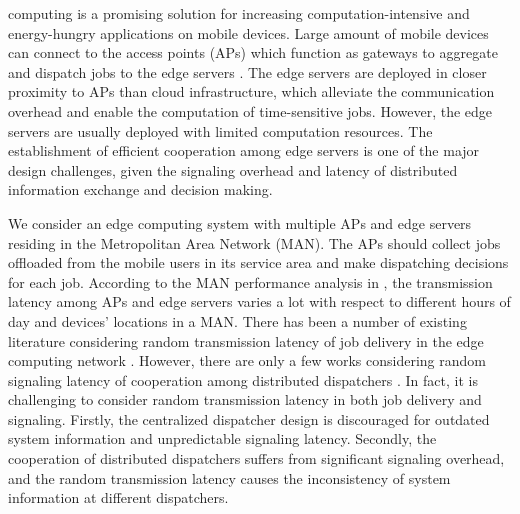 
 computing is a promising solution for increasing computation-intensive and energy-hungry applications on mobile devices.
Large amount of mobile devices can connect to the access points (APs) which function as gateways to aggregate and dispatch jobs to the edge servers \cite{MEC-SURVEY}.
The edge servers are deployed {in closer proximity} to APs than cloud infrastructure, which alleviate the communication overhead and enable the computation of time-sensitive jobs.
However, the edge servers are usually deployed with limited computation resources.
The establishment of efficient cooperation among edge servers is one of the major design challenges, {given the signaling overhead and latency of distributed information exchange and decision making.}

We consider an edge computing system with multiple APs and edge servers residing in the Metropolitan Area Network (MAN).
The APs should collect jobs offloaded from the mobile users in its service area and make dispatching decisions for each job.
According to the MAN performance analysis in \cite{MAN-LATENCY}, the transmission latency {among APs and edge servers} varies a lot with respect to different hours of day and devices' locations in a MAN.
There has been a number of existing literature considering random transmission latency of job delivery in the edge computing network \cite{latency-EDGE19,MOBIHOC19-ZhouZ,IOTJ18-FanQ,TOC19-LiuC,JSAC19-AlameddineHA}.
However, there are only a few works considering random signaling latency of cooperation among distributed dispatchers \cite{tan-online,TWC18-LyuX}.
In fact, it is challenging to consider random transmission latency in both job delivery and signaling.
Firstly, the centralized dispatcher design is discouraged for outdated system information and unpredictable signaling latency.
Secondly, the cooperation of distributed dispatchers suffers from significant signaling overhead, and the random transmission latency causes the inconsistency of system information at different dispatchers.


